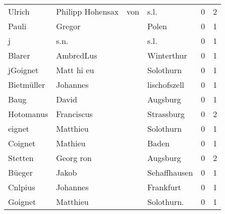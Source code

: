 \begin{tabular}{llllrr}
                   Ulrich &                  Philipp  Hohensax &         von &                                        s.l. &          0 &         2 \\
                    Pauli &                             Gregor &             &                                       Polen &          0 &         1 \\
                        j &                               s.n. &             &                                        s.l. &          0 &         1 \\
                   Blarer &                          AmbrcdLus &             &                                  Winterthur &          0 &         1 \\
                 jGoignet &                         Matt hi eu &             &                                   Solothurn &          0 &         1 \\
               Bietmüller &                           Johannes &             &                                lischofszell &          0 &         1 \\
                     Baug &                              David &             &                                    Augsburg &          0 &         1 \\
                Hotomanus &                         Franciscus &             &                                  Strassburg &          0 &         2 \\
                   eignet &                           Matthieu &             &                                   Solothurn &          0 &         1 \\
                  Coignet &                            Mathieu &             &                                       Baden &          0 &         1 \\
                  Stetten &                          Georg ron &             &                                    Augsburg &          0 &         2 \\
                   Büeger &                              Jakob &             &                                Sehaffhausen &          0 &         1 \\
                  Cnlpius &                           Johannes &             &                                   Frankfurt &          0 &         1 \\
                  Goignet &                           Matthieu &             &                                 Solothurn.  &          0 &         1 \\

\end{tabular}
